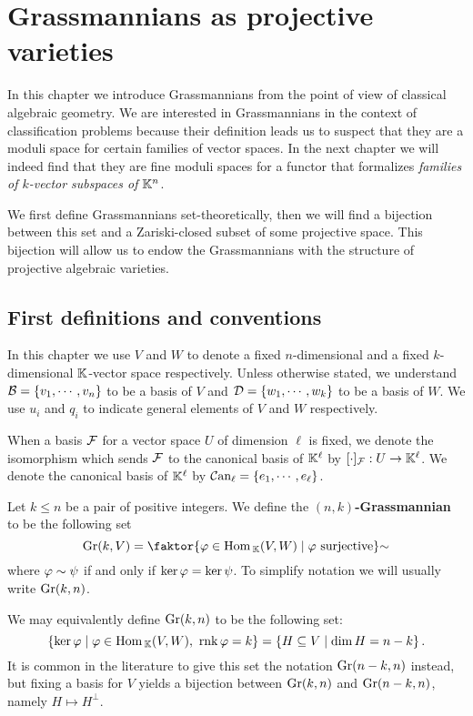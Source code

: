 \chapter{Grassmannians as projective varieties}
In this chapter we introduce Grassmannians from the point of view of classical algebraic geometry. We are interested in Grassmannians in the context of classification problems because their definition leads us to suspect that they are a moduli space for certain families of vector spaces. In the next chapter we will indeed find that they are fine moduli spaces for a functor that formalizes \textit{families of $k$-vector subspaces of $\mathbb{K}^n$}.

We first define Grassmannians set-theoretically, then we will find a bijection between this set and a Zariski-closed subset of some projective space. This bijection will allow us to endow the Grassmannians with the structure of projective algebraic varieties.

\section{First definitions and conventions}
\begin{notation}
In this chapter we use $V$ and $W$ to denote a fixed $n$-dimensional and a fixed $k$-dimensional $\mathbb{K}$-vector space respectively. 
Unless otherwise stated, we understand $\mathcal{B}=\left\{{v_1,\cdots, v_n}\right\}$ to be a basis of $V$ and $\mathcal{D}=\left\{{w_1,\cdots, w_k}\right\}$ to be a basis of $W$. We use $u_i$ and $q_i$ to indicate general elements of $V$ and $W$ respectively.

When a basis $\mathcal{F}$ for a vector space $U$ of dimension $\ell$ is fixed, we denote the isomorphism which sends $\mathcal{F}$ to the canonical basis of $\mathbb{K}^\ell$ by $[\cdot]_{\mathcal{F}}:U\to \mathbb{K}^\ell$. We denote the canonical basis of $\mathbb{K}^\ell$ by ${\mathcal{C}\mathrm{an}}_\ell=\left\{{e_1,\cdots, e_\ell}\right\}$.
\end{notation}

\begin{definition}[Grassmannian]
Let $k\leq n$ be a pair of positive integers. We define the \textbf{$(n,k)$-Grassmannian} to be the following set
\[\Gr(k,V)=\quot{\cpa{\vp\in\Hom_\K(V,W)\mid \vp\text{ surjective}}}\sim\]
where $\varphi\sim \psi$ if and only if $\ker \varphi=\ker \psi$. To simplify notation we will usually write $\mathrm{Gr}(k,n)$.
\end{definition}

\begin{remark}
We may equivalently define $\mathrm{Gr}(k,n)$ to be the following set:
\[\left\{{\ker \varphi\mid \varphi\in \mathrm{Hom}\,_{\mathbb{K}}(V,W),\ \mathrm{rnk}\, \varphi=k}\right\}=\left\{{H\subseteq V\mid \dim H=n-k}\right\}.\]
It is common in the literature to give this set the notation $\mathrm{Gr}(n-k,n)$ instead, but fixing a basis for $V$ yields a bijection between $\mathrm{Gr}(k,n)$ and $\mathrm{Gr}(n-k,n)$, namely $H\mapsto H^\perp$.
\end{remark}

